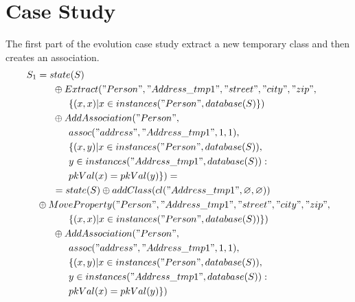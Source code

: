 \documentclass[11pt]{article}
\begin{document}
\section{Case Study}
\label{sec:caseStudy}
The first part of the evolution case study extract a new temporary class and then creates an association.
\begin{align*}
S_1 &= state(S) \\
& \;\;\;\;\;\; \oplus Extract("Person", "Address\_tmp1", "street", "city", "zip",\\ 
& \;\;\;\;\;\; \;\;\;\;\;\;  \{(x,x) | x \in instances("Person", database(S)\}) \\
& \;\;\;\;\;\; \oplus AddAssociation("Person", \\ 
& \;\;\;\;\;\;\;\;\;\;\;\; assoc("address", "Address\_tmp1", 1, 1),\\ 
& \;\;\;\;\;\;\;\;\;\;\;\; \{(x,y)| x \in instances("Person", database(S)), \\
& \;\;\;\;\;\; \;\;\;\;\;\; y \in instances("Address\_tmp1", database(S)) : \\ 
& \;\;\;\;\;\;\;\;\;\;\;\; pkVal(x) = pkVal(y) \}) = \\
& \;\;\;\;\;\; =  state(S) \oplus addClass(cl("Address\_tmp1", \varnothing, \varnothing)) \\
& \oplus MoveProperty("Person", "Address\_tmp1", "street", "city", "zip", \\
& \;\;\;\;\;\; \;\;\;\;\;\;    \{(x,x) | x \in instances("Person", database(S))\}) \\
& \;\;\;\;\;\; \oplus AddAssociation("Person", \\ 
& \;\;\;\;\;\;\;\;\;\;\;\; assoc("address", "Address\_tmp1", 1, 1),\\ 
& \;\;\;\;\;\;\;\;\;\;\;\; \{(x,y)| x \in instances("Person", database(S)), \\
& \;\;\;\;\;\; \;\;\;\;\;\; y \in instances("Address\_tmp1", database(S)) : \\ 
& \;\;\;\;\;\;\;\;\;\;\;\; pkVal(x) = pkVal(y) \})
\end{align*}
\end{document}
